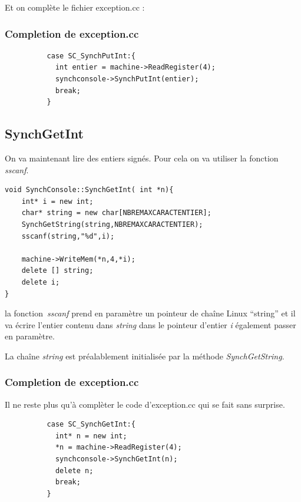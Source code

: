 \documentclass[a4paper,10pt]{article}
\begin{document}
    Et on complète le fichier exception.cc :
    \textcolor{TealBlue}{\subsubsection*{Completion de exception.cc}}
    \begin{lstlisting}
          case SC_SynchPutInt:{
            int entier = machine->ReadRegister(4);
            synchconsole->SynchPutInt(entier);
            break;
          }     
    \end{lstlisting}

    \textcolor{NavyBlue}{\subsection{SynchGetInt}}
    On va maintenant lire des entiers signés. Pour cela on va utiliser la fonction \emph{sscanf}. 
    \begin{lstlisting}
void SynchConsole::SynchGetInt( int *n){
	int* i = new int;
	char* string = new char[NBREMAXCARACTENTIER];
	SynchGetString(string,NBREMAXCARACTENTIER);
	sscanf(string,"%d",i);

	machine->WriteMem(*n,4,*i);
	delete [] string;
	delete i;
}      
    \end{lstlisting}
    la fonction \emph{sscanf} prend en paramètre un pointeur de chaîne Linux ``string'' et il va écrire l'entier contenu dans \emph{string} dans le pointeur 
    d'entier \emph{i} également passer en paramètre.
    
    La chaîne \emph{string} est préalablement initialisée par la méthode \emph{SynchGetString}.
    
    \textcolor{TealBlue}{\subsubsection*{Completion de exception.cc}}
    Il ne reste plus qu'à complèter le code d'exception.cc qui se fait sans surprise.
    \begin{lstlisting}
          case SC_SynchGetInt:{
            int* n = new int;
            *n = machine->ReadRegister(4);
            synchconsole->SynchGetInt(n);
            delete n;
            break;
          }     
    \end{lstlisting}
\end{document}
